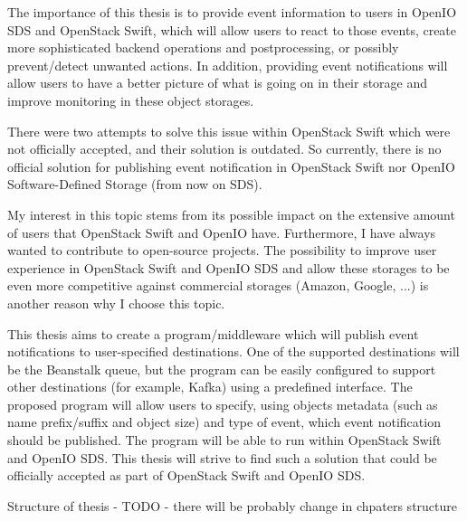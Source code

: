 The importance of this thesis is to provide event information to users in OpenIO SDS and OpenStack Swift, which will allow users to react to those events, create more sophisticated backend operations and postprocessing, or possibly prevent/detect unwanted actions. In addition, providing event notifications will allow users to have a better picture of what is going on in their storage and improve monitoring in these object storages.

There were two attempts\cite{swiftPatch1}\cite{swiftPatch2} to solve this issue within OpenStack Swift which were not officially accepted, and their solution is outdated. So currently, there is no official solution for publishing event notification in OpenStack Swift nor OpenIO Software-Defined Storage (from now on SDS).

My interest in this topic stems from its possible impact on the extensive amount of users that OpenStack Swift and OpenIO have. Furthermore, I have always wanted to contribute to open-source projects. The possibility to improve user experience in OpenStack Swift and OpenIO SDS and allow these storages to be even more competitive against commercial storages (Amazon, Google, ...) is another reason why I choose this topic.

This thesis aims to create a program/middleware which will publish event notifications to user-specified destinations. One of the supported destinations will be the Beanstalk queue, but the program can be easily configured to support other destinations (for example, Kafka) using a predefined interface. The proposed program will allow users to specify, using objects metadata (such as name prefix/suffix and object size) and type of event, which event notification should be published. The program will be able to run within OpenStack Swift and OpenIO SDS. This thesis will strive to find such a solution that could be officially accepted as part of OpenStack Swift and OpenIO SDS.

Structure of thesis - TODO - there will be probably change in chpaters structure


